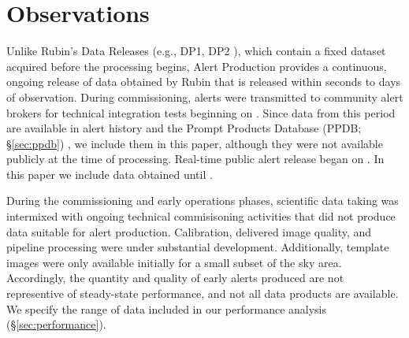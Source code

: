 \section{Observations} \label{sec:observations}


Unlike Rubin's Data Releases (e.g., DP1, DP2 ), which contain a fixed dataset acquired before the processing begins, Alert Production provides a continuous, ongoing release of data obtained by Rubin that is released within seconds to days of observation.
During commissioning, alerts were transmitted to community alert brokers for technical integration tests beginning on \AlertIntegrationStartDate.
Since data from this period are available in alert history and the Prompt Products Database (PPDB; \S \ref{sec:ppdb}) , we include them in this paper, although they were not available publicly at the time of processing.
Real-time public alert release began on \PublicAlertsStartDate.
In this paper we include data obtained until .

During the commissioning and early operations phases, scientific data taking was intermixed with ongoing technical commisisoning activities that did not produce data suitable for alert production.
Calibration, delivered image quality, and pipeline processing were under substantial development.
Additionally, template images were only available initially for a small subset of the sky area.
Accordingly, the quantity and quality of early alerts produced are not representive of steady-state performance, and not all data products are available.
We specify the range of data included in our performance analysis (\S \ref{sec:performance}).





